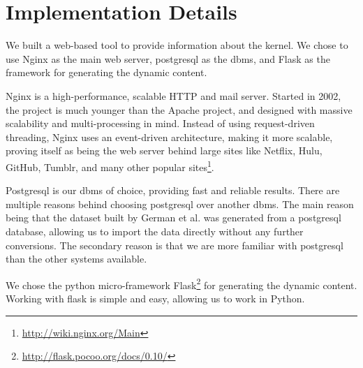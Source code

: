 \documentclass[conference, draftclsnofoot]{IEEEtran}
\begin{document}
\section{Implementation Details}


We built a web-based tool to provide information about the kernel.  We chose to use
Nginx as the main web server, postgresql as the dbms, and Flask as the framework for
generating the dynamic content.

Nginx is a high-performance, scalable HTTP and mail server. Started in 2002, the
project is much younger than the Apache project, and designed with massive
scalability and multi-processing in mind. Instead of using request-driven threading,
Nginx uses an event-driven architecture, making it more scalable, proving itself as
being the web server behind large sites like Netflix, Hulu, GitHub, Tumblr, and many
other popular sites\footnote{\url{http://wiki.nginx.org/Main}}.

Postgresql is our dbms of choice, providing fast and reliable results. There are
multiple reasons behind choosing postgresql over another dbms. The main reason being
that the dataset built by German et al. was generated from a postgresql database,
allowing us to import the data directly without any further conversions. The
secondary reason is that we are more familiar with postgresql than the other systems
available.

We chose the python micro-framework
Flask\footnote{\url{http://flask.pocoo.org/docs/0.10/}} for generating the dynamic
content. Working with flask is simple and easy, allowing us to work in Python.
\end{document}
